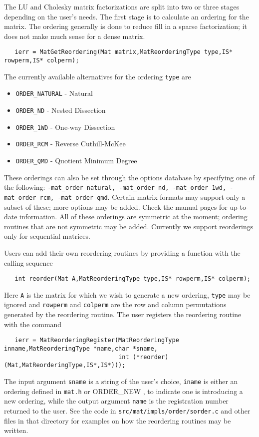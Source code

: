 The LU and Cholesky 
matrix factorizations are split into 
two or three stages depending on the user's needs. The first stage is 
to calculate an ordering for the matrix.  The ordering generally is 
done to reduce fill in a sparse factorization; it does not make much 
sense for a dense matrix.  
\begin{verbatim}
   ierr = MatGetReordering(Mat matrix,MatReorderingType type,IS* rowperm,IS* colperm); 
\end{verbatim}
The currently available alternatives for the ordering {\tt type} are 
\begin{itemize}
\item {\tt ORDER\_NATURAL} - Natural
\item {\tt ORDER\_ND} - Nested Dissection
\item {\tt ORDER\_1WD} - One-way Dissection
\item {\tt ORDER\_RCM} - Reverse Cuthill-McKee
\item {\tt ORDER\_QMD} - Quotient Minimum Degree
\end{itemize}
These orderings can also be set through the options database by specifying 
one of the following:  {\tt -mat\_order natural, -mat\_order nd, 
-mat\_order 1wd, -mat\_order rcm, -mat\_order qmd}.
  
  
  
 
Certain matrix formats may support only a subset of these; more options may 
be added. Check the manual pages for up-to-date information. All of these orderings are 
symmetric at the moment; ordering routines that are 
not symmetric may be added. Currently we support reorderings only for 
sequential matrices.

Users can add their own reordering routines 
by providing a function with the calling sequence
\begin{verbatim}
   int reorder(Mat A,MatReorderingType type,IS* rowperm,IS* colperm);
\end{verbatim}
Here {\tt A} is the matrix for which we wish to generate a new ordering, 
{\tt type} may be ignored and {\tt rowperm} and {\tt colperm} are the row
and column permutations generated by the reordering routine.
The user registers the reordering routine
with the command
\begin{verbatim}
   ierr = MatReorderingRegister(MatReorderingType inname,MatReorderingType *name,char *sname,
                                int (*reorder)(Mat,MatReorderingType,IS*,IS*)));
\end{verbatim}
The   
input argument {\tt *sname} is a string of the user's choice, {\tt iname} is either 
an ordering defined in {\tt mat.h} or {ORDER\_NEW} ,
to indicate one is introducing a new ordering, while the output
argument {\tt *name} is the registration number returned to the user.
See the code in {\tt src/mat/impls/order/sorder.c} and other files in that 
directory for examples on how the reordering routines may be written.

